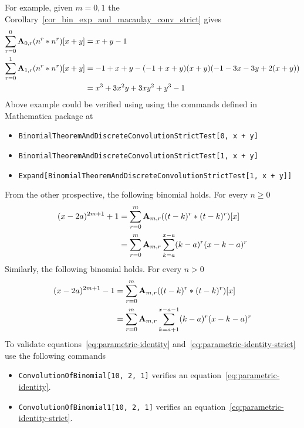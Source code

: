 For example, given $m=0,1$ the Corollary~\ref{cor_bin_exp_and_macaulay_conv_strict} gives
\begin{equation*}
    \begin{split}
        \sum_{r=0}^{0} {\mathbf{A}} \sb{0,r} (n \sp{r} \ast n \sp{r}) [x+y]
        &= x + y - 1 \\
        \sum_{r=0}^{1} {\mathbf{A}} \sb{1,r} (n \sp{r} \ast n \sp{r}) [x+y]
        &= -1 + x + y - (-1 + x + y) (x + y) (-1 - 3 x - 3 y + 2 (x + y)) \\
        &= x^3 + 3 x^2 y + 3 x y^2 + y^3 - 1
    \end{split}
\end{equation*}
Above example could be verified using using the commands defined in Mathematica package at~\cite{github_source_files}
\begin{itemize}
    \item \texttt{BinomialTheoremAndDiscreteConvolutionStrictTest[0, x + y]}
    \item \texttt{BinomialTheoremAndDiscreteConvolutionStrictTest[1, x + y]}
    \item \texttt{Expand[BinomialTheoremAndDiscreteConvolutionStrictTest[1, x + y]]}
\end{itemize}
From the other prospective, the following binomial holds.
For every $n \geq 0$
\begin{equation}
    \label{eq:parametric-identity}
    \begin{split}
        (x-2a)^{2m+1} + 1 &= \sum_{r=0}^{m} {\mathbf{A}} \sb{m,r} ((t-k)^r \ast (t-k)^r)[x] \\
                          &= \sum_{r=0}^{m} {\mathbf{A}} \sb{m,r} \sum_{k=a}^{x-a} (k-a)^r (x-k-a)^r
    \end{split}
\end{equation}
Similarly, the following binomial holds.
For every $n > 0$
\begin{equation}
    \label{eq:parametric-identity-strict}
    \begin{split}
        (x-2a)^{2m+1} - 1 &= \sum_{r=0}^{m} {\mathbf{A}} \sb{m,r} ((t-k)^r \ast (t-k)^r)[x] \\
                          &= \sum_{r=0}^{m} {\mathbf{A}} \sb{m,r} \sum_{k=a+1}^{x-a-1} (k-a)^r (x-k-a)^r
    \end{split}
\end{equation}
To validate equations~\eqref{eq:parametric-identity} and~\eqref{eq:parametric-identity-strict}
use the following commands
\begin{itemize}
    \item \texttt{ConvolutionOfBinomial[10, 2, 1]} verifies an equation~\eqref{eq:parametric-identity}.
    \item \texttt{ConvolutionOfBinomial1[10, 2, 1]} verifies an equation~\eqref{eq:parametric-identity-strict}.
\end{itemize}

